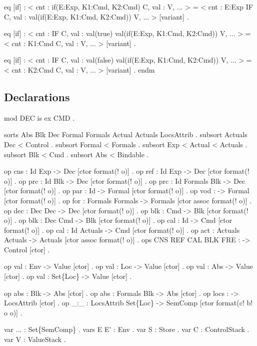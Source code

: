\documentclass{llncs}%
\begin{document}
    eq [if] :
       < cnt : if(E:Exp, K1:Cmd, K2:Cmd) C, val : V, ... > 
     =
       < cnt : E:Exp IF C,
         val : val(if(E:Exp, K1:Cmd, K2:Cmd)) V, ... > [variant] .

    eq [if] :
       < cnt : IF C,
         val : val(true) val(if(E:Exp, K1:Cmd, K2:Cmd)) V, ... > 
     =
       < cnt : K1:Cmd C,
         val : V, ... > [variant] .

    eq [if] :
       < cnt : IF C,
         val : val(false) val(if(E:Exp, K1:Cmd, K2:Cmd)) V, ... > 
     =
       < cnt : K2:Cmd C,
         val : V, ... > [variant] .
endm
\nwendcode{}\nwdocspar

\subsection{Declarations}
\nwenddocs{}\endmoddef\nwstartdeflinemarkup\nwenddeflinemarkup
mod DEC is
    ex CMD .

    sorts Abs Blk Dec Formal Formals Actual Actuals LocsAttrib .
    subsort Actuals Dec < Control .
    subsort Formal < Formals .
    subsort Exp < Actual < Actuals .
    subsort Blk < Cmd .
    subsort Abs < Bindable .

    op cns : Id Exp -> Dec [ctor format(! o)] .
    op ref : Id Exp -> Dec [ctor format(! o)] .
    op prc : Id Blk -> Dec [ctor format(! o)] .
    op prc : Id Formals Blk -> Dec [ctor format(! o)] .
    op par : Id -> Formal [ctor format(! o)] .
    op vod : -> Formal [ctor format(! o)] .
    op for : Formals Formals -> Formals [ctor assoc format(! o)] .
    op dec : Dec Dec -> Dec [ctor format(! o)] .
    op blk : Cmd -> Blk [ctor format(! o)] .
    op blk : Dec Cmd -> Blk [ctor format(! o)] .
    op cal : Id -> Cmd [ctor format(! o)] .
    op cal : Id Actuals -> Cmd [ctor format(! o)] .
    op act : Actuals Actuals -> Actuals [ctor assoc format(! o)] .
    ops CNS REF CAL BLK FRE : -> Control [ctor] .

    op val : Env -> Value [ctor] .
    op val : Loc -> Value [ctor] .
    op val : Abs -> Value [ctor] .
    op val : Set\{Loc\} -> Value [ctor] .
    
    op abs : Blk -> Abs [ctor] .
    op abs : Formals Blk -> Abs [ctor] .
    op locs : -> LocsAttrib [ctor] .
    op _:_ : LocsAttrib Set\{Loc\} -> SemComp [ctor format(c! b! o o)] .

    var ... : Set\{SemComp\} . vars E E' : Env . var S : Store .
    var C : ControlStack . var V : ValueStack .
\end{document}
